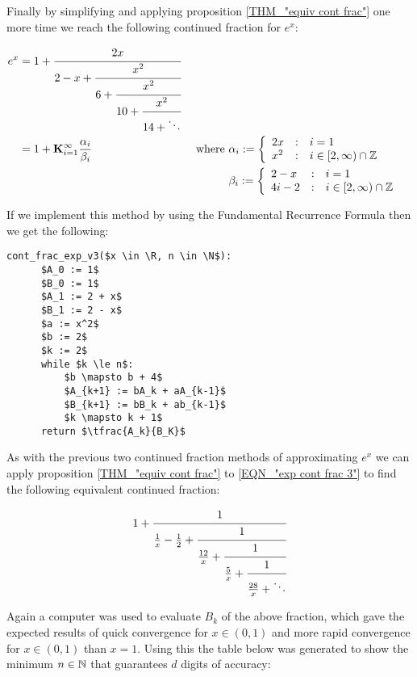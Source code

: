 Finally by simplifying and applying proposition \ref{THM_"equiv cont frac"} one more time we reach the following continued fraction for \(e^x\):

\begin{align}
e^x &= 1 + \cfrac{2x}{2-x+
		   \cfrac{x^2}{6 +
		   \cfrac{x^2}{10+
		   \cfrac{x^2}{14+\ddots} } } } \label{EQN_"exp cont frac 3"}\\
	&= 1 + \mathbf{K}_{i=1}^\infty \frac{\alpha_i}{\beta_i}
		&\textrm{ where }
		&\alpha_i := \left\{\begin{array}{lcl}
			2x &:& i = 1\\
			x^2 &:& i \in [2, \infty)\cap\mathbb{Z}
			\end{array}\right.\nonumber\\
	&&	&\beta_i := \left\{\begin{array}{lcl}
			2 - x &:& i = 1\\
			4i - 2 &:& i \in [2, \infty)\cap \mathbb{Z}
			\end{array}\right.\nonumber
\end{align}

If we implement this method by using the Fundamental Recurrence Formula then we get the following:

\begin{lstlisting}[caption={Continued fraction for \(e^x\) version 3},label={PCD_"cont exp v3"}]
  cont_frac_exp_v3($x \in \R, n \in \N$):
      $A_0 := 1$
      $B_0 := 1$
      $A_1 := 2 + x$
      $B_1 := 2 - x$
      $a := x^2$
      $b := 2$
      $k := 2$
      while $k \le n$:
          $b \mapsto b + 4$
          $A_{k+1} := bA_k + aA_{k-1}$
          $B_{k+1} := bB_k + ab_{k-1}$
          $k \mapsto k + 1$
      return $\tfrac{A_k}{B_K}$
\end{lstlisting}

As with the previous two continued fraction methods of approximating \(e^x\) we can apply proposition \ref{THM_"equiv cont frac"} to \ref{EQN_"exp cont frac 3"} to find the following equivalent continued fraction:

\begin{displaymath}
	1 + \cfrac{1}{\frac{1}{x} - \frac{1}{2} +
		\cfrac{1}{\frac{12}{x} + 
		\cfrac{1}{\frac{5}{x} +
		\cfrac{1}{\frac{28}{x} + \ddots } } } }
\end{displaymath}

Again a computer was used to evaluate \(B_k\) of the above fraction, which gave the expected results of quick convergence for \(x \in (0,1)\) and more rapid convergence for \(x \in (0,1)\) than \(x = 1\). Using this the table below was generated to show the minimum \(n \in \mathbb{N}\) that guarantees \(d\) digits of accuracy:


